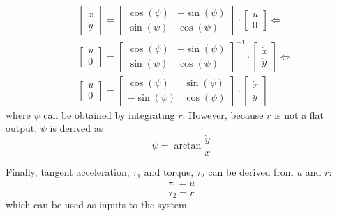 \begin{equation}
\begin{split}
    & \begin{bmatrix}
        \dot{x} \\ \dot{y}
    \end{bmatrix} = 
    \begin{bmatrix}
        \cos(\psi) & - \sin(\psi) \\
        \sin(\psi) & \cos(\psi)
    \end{bmatrix} \cdot
    \begin{bmatrix}
        u \\ 0
    \end{bmatrix} \Leftrightarrow  \\
    & \begin{bmatrix}
        u \\ 0
    \end{bmatrix} = 
    \begin{bmatrix}
        \cos(\psi) & - \sin(\psi) \\
        \sin(\psi) & \cos(\psi)
    \end{bmatrix}^{-1} \cdot
    \begin{bmatrix}
        \dot{x} \\ \dot{y}
    \end{bmatrix} \Leftrightarrow \\
    & \begin{bmatrix}
        u \\ 0
    \end{bmatrix} = 
    \begin{bmatrix}
        \cos(\psi) & \sin(\psi) \\
        - \sin(\psi) & \cos(\psi)
    \end{bmatrix} \cdot
    \begin{bmatrix}
        \dot{x} \\ \dot{y}
    \end{bmatrix}
\end{split}
\end{equation}
where $\psi$ can be obtained by integrating $r$. However, because $r$ is not a flat output, $\psi$ is derived as
\begin{equation}
    \psi = \arctan{\frac{\dot{y}}{\dot{x}}}
\end{equation}
\par Finally, tangent acceleration, $\tau_1$ and torque, $\tau_2$ can be derived from $u$ and $r$:
\begin{equation}
    \tau_1 = \dot{u}
\end{equation}
\begin{equation}
    \tau_2 = \dot{r}
\end{equation}
which can be used as inputs to the system.

